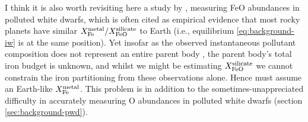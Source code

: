 




I think it is also worth revisiting here a study by \citet{doyle_oxygen_2019}, measuring FeO abundances in polluted white dwarfs, which is often cited as empirical evidence that most rocky planets have similar $X_{\ce{Fe}}^{\rm metal}/X_{\ce{FeO}}^{\rm silicate}$ to Earth (i.e., equilibrium \eqref{eq:background-iw} is at the same position). Yet insofar as the observed instantaneous pollutant composition does not represent an entire parent body \citep[e.g.,][]{brouwers_asynchronous_2022, brouwers_asynchronous_2023}, the parent body's total iron budget is unknown, and whilst we might be estimating $X_{\ce{FeO}}^{\rm silicate}$ we cannot constrain the iron partitioning from these observations alone. Hence \citet{doyle_oxygen_2019} must assume an Earth-like $X_{\ce{Fe}}^{\rm metal}$. This problem is in addition to the sometimes-unappreciated difficulty in accurately measuring O abundances in polluted white dwarfs (section \ref{sec:background-pwd}). 


